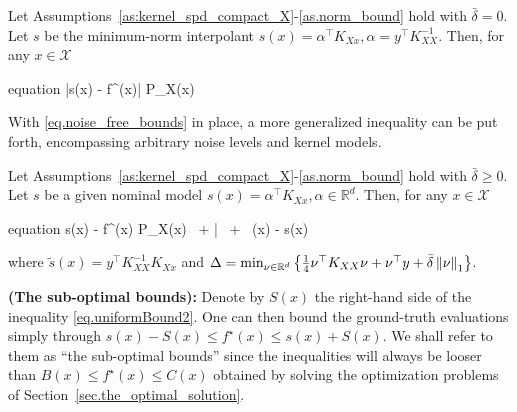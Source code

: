 \begin{proposition}
	Let Assumptions~\ref{as:kernel_spd_compact_X}-\ref{as.norm_bound} hold with $\bar \delta = 0$. Let $s$ be the minimum-norm interpolant $s(x)=\alpha^\top K_{Xx}, \alpha = y^\top K_{XX}^{-1}$. Then, for any $x \in \mathcal{X}$
	\label{prop.noise_free_bound}
	\begin{empheq}[box={\mymathbox[colback=black!2,drop small lifted shadow, sharp corners]}]{equation}
		\label{eq.noise_free_bounds}
		\left|s(x) - f^\star(x)\right| \leq P_X(x) 
	\end{empheq}
\end{proposition}

With \eqref{eq.noise_free_bounds} in place, a more generalized inequality can be put forth, encompassing arbitrary noise levels and kernel models.

\begin{proposition}
	\label{prop:closed_form_bounds}
	Let Assumptions~\ref{as:kernel_spd_compact_X}-\ref{as.norm_bound} hold with $\bar\delta \geq 0$. Let $s$ be a given nominal model $s(x)=\alpha^\top K_{Xx}, \alpha \in \mathbb{R}^d$. Then, for any $x \in \mathcal{X}$
	\begin{empheq}[box={\mymathbox[colback=black!2,drop small lifted shadow, sharp corners]}]{equation}
		\vert s(x) - f^\star(x) \vert \leq  P_X(x) \,  + \bar{\delta} \,  + \, \vert {}(x) - s(x) \vert
		\label{eq.uniformBound2}
	\end{empheq}
	where $\tilde{s}(x) = y^\top K_{XX}^{-1} K_{Xx}$ and $\Delta = \min_{\nu \in \mathbb{R}^d} \left\{ \frac{1}{4}\nu^\top K_{XX}\nu + \nu^\top y + \bar{\delta} \left\| \nu \right\|_1\right\}$.
\end{proposition}

\begin{remark}
	\textbf{(The sub-optimal bounds):}
	Denote by $S(x)$ the right-hand side of the inequality \eqref{eq.uniformBound2}. One can then bound the ground-truth evaluations simply through $s(x) - S(x) \leq f^\star(x) \leq s(x) + S(x)$. We shall refer to them as ``the sub-optimal bounds'' since the inequalities will always be looser than $B(x) \leq f^\star(x) \leq C(x)$ obtained by solving the optimization problems of Section~\ref{sec.the_optimal_solution}.
\end{remark}

